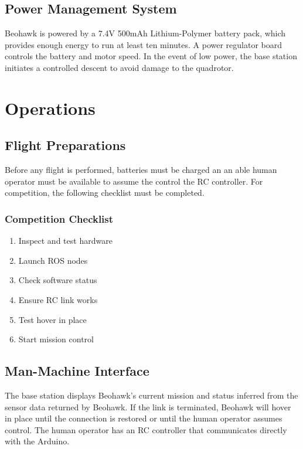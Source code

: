 \documentclass[12pt, letterpaper]{article}
\begin{document}
\subsection{Power Management System}

Beohawk is powered by a 7.4V 500mAh Lithium-Polymer battery pack, which provides enough energy to run at least ten minutes. A power regulator board controls the battery and motor speed.  In the event of low power, the base station initiates a controlled descent to avoid damage to the quadrotor.

\section{Operations}

\subsection{Flight Preparations}
Before any flight is performed, batteries must be charged an an able human operator must be available to assume the control the RC controller.  For competition, the following checklist must be completed.

\subsubsection{Competition Checklist}
\begin{enumerate}
  \item Inspect and test hardware
  \item Launch ROS nodes
  \item Check software status
  \item Ensure RC link works
  \item Test hover in place
  \item Start mission control
\end{enumerate}

\subsection{Man-Machine Interface}
The base station displays Beohawk's current mission and status inferred from the sensor data returned by Beohawk.  If the link is terminated, Beohawk will  hover in place until the connection is restored or until the human operator assumes control. The human operator has an RC controller that communicates directly with the Arduino.
\end{document}

